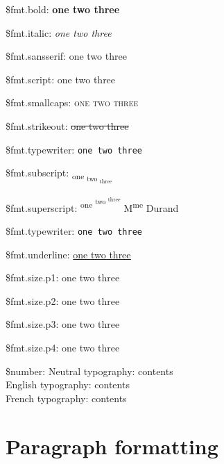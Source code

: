 \documentclass[ebook,demo]{pyscribe}
\newcommand\scripttext[1]{{\fontfamily{pzc}\selectfont\large#1}}
\begin{document}
\par\$fmt.bold:  \textbf{one
 \textbf{two
 \textbf{three}}}
\par\$fmt.italic:  \textit{one
 \textit{two
 \textit{three}}}
\par\$fmt.sansserif:  \textsf{one
 \textsf{two
 \textsf{three}}}
\par\$fmt.script:  \scripttext{one
 \scripttext{two
 \scripttext{three}}}
\par\$fmt.smallcaps:  \textsc{one
 \textsc{two
 \textsc{three}}}
\par\$fmt.strikeout:  \sout{one
 \sout{two
 \sout{three}}}
\par\$fmt.typewriter:  \texttt{one
 \texttt{two
 \texttt{three}}}
\par\$fmt.subscript:  \textsubscript{one
 \textsubscript{two
 \textsubscript{three}}}
\par\$fmt.superscript:  \textsuperscript{one
 \textsuperscript{two
 \textsuperscript{three}}} M\textsuperscript{me} Durand
\par\$fmt.typewriter:  \texttt{one
 \texttt{two
 \texttt{three}}}
\par\$fmt.underline:  \underline{one
 \underline{two
 \underline{three}}}
\par\$fmt.size.p1:  {\large one
 {\large two
 {\large three}}}
\par\$fmt.size.p2:  {\Large one
 {\Large two
 {\Large three}}}
\par\$fmt.size.p3:  {\LARGE one
 {\LARGE two
 {\LARGE three}}}
\par\$fmt.size.p4:  {\Huge one
 {\Huge two
 {\Huge three}}}

\par\$number: Neutral typography: contents \\
English typography: contents \\
French typography: contents \\

\section{Paragraph formatting}
\end{document}
